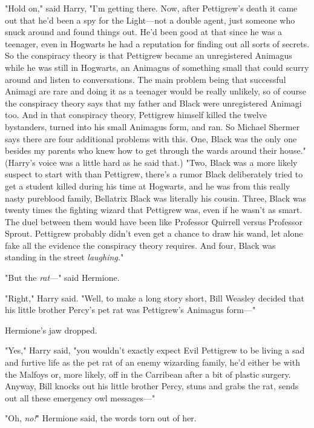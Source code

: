 "Hold on," said Harry, "I'm getting there. Now, after Pettigrew's death it came
out that he'd been a spy for the Light---not a double agent, just someone who
snuck around and found things out. He'd been good at that since he was a
teenager, even in Hogwarts he had a reputation for finding out all sorts of
secrets. So the conspiracy theory is that Pettigrew became an unregistered
Animagus while he was still in Hogwarts, an Animagus of something small that
could scurry around and listen to conversations. The main problem being that
successful Animagi are rare and doing it as a teenager would be really
unlikely, so of course the conspiracy theory says that my father and Black were
unregistered Animagi too. And in that conspiracy theory, Pettigrew himself
killed the twelve bystanders, turned into his small Animagus form, and ran. So
Michael Shermer says there are four additional problems with this. One, Black
was the only one besides my parents who knew how to get through the wards
around their house." (Harry's voice was a little hard as he said that.) "Two,
Black was a more likely suspect to start with than Pettigrew, there's a rumor
Black deliberately tried to get a student killed during his time at Hogwarts,
and he was from this really nasty pureblood family, Bellatrix Black was
literally his cousin. Three, Black was twenty times the fighting wizard that
Pettigrew was, even if he wasn't as smart. The duel between them would have
been like Professor Quirrell versus Professor Sprout. Pettigrew probably didn't
even get a chance to draw his wand, let alone fake all the evidence the
conspiracy theory requires. And four, Black was standing in the street
\emph{laughing.}"

"But the \emph{rat}\mbox{---}" said Hermione.

"Right," Harry said. "Well, to make a long story short, Bill Weasley decided
that his little brother Percy's pet rat was Pettigrew's Animagus form\mbox{---}"

Hermione's jaw dropped.

"Yes," Harry said, "you wouldn't exactly expect Evil Pettigrew to be living a
sad and furtive life as the pet rat of an enemy wizarding family, he'd either
be with the Malfoys or, more likely, off in the Carribean after a bit of
plastic surgery. Anyway, Bill knocks out his little brother Percy, stuns and
grabs the rat, sends out all these emergency owl messages\mbox{---}"

"Oh, \emph{no!}" Hermione said, the words torn out of her.

